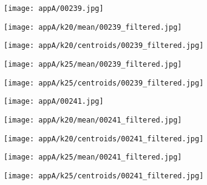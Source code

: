 \documentclass[draft,final]{vutinfth} %
\begin{document}
\begin{appendices}
\begin{figure}[h]
\centering
  \begin{subfigure}[t]{0.19\columnwidth}
    \centering
    \texttt{[image: appA/00239.jpg]}
  \end{subfigure}
  \begin{subfigure}[t]{0.19\columnwidth}
    \centering
    \texttt{[image: appA/k20/mean/00239\_filtered.jpg]}
  \end{subfigure}
  \begin{subfigure}[t]{0.19\columnwidth}
    \centering
    \texttt{[image: appA/k20/centroids/00239\_filtered.jpg]}
  \end{subfigure}
  \begin{subfigure}[t]{0.19\columnwidth}
    \centering
    \texttt{[image: appA/k25/mean/00239\_filtered.jpg]}
  \end{subfigure}
  \begin{subfigure}[t]{0.19\columnwidth}
    \centering
    \texttt{[image: appA/k25/centroids/00239\_filtered.jpg]}
  \end{subfigure}
\caption{}
\end{figure}  

\begin{figure}[h]
\centering
  \begin{subfigure}[t]{0.19\columnwidth}
    \centering
    \texttt{[image: appA/00241.jpg]}
  \end{subfigure}
  \begin{subfigure}[t]{0.19\columnwidth}
    \centering
    \texttt{[image: appA/k20/mean/00241\_filtered.jpg]}
  \end{subfigure}
  \begin{subfigure}[t]{0.19\columnwidth}
    \centering
    \texttt{[image: appA/k20/centroids/00241\_filtered.jpg]}
  \end{subfigure}
  \begin{subfigure}[t]{0.19\columnwidth}
    \centering
    \texttt{[image: appA/k25/mean/00241\_filtered.jpg]}
  \end{subfigure}
  \begin{subfigure}[t]{0.19\columnwidth}
    \centering
    \texttt{[image: appA/k25/centroids/00241\_filtered.jpg]}
  \end{subfigure}
	\caption{}
  \label{appA:241}
\end{figure}  


\end{appendices}
\end{document}
